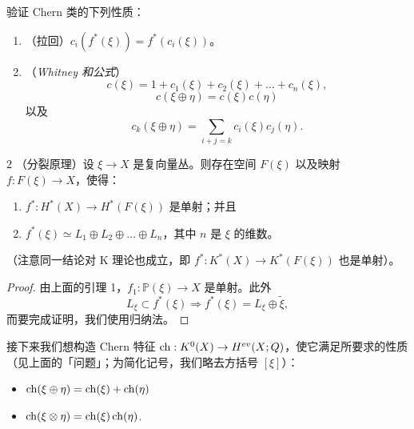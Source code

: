 验证 Chern 类的下列性质：
\begin{enumerate}[label=\arabic*.]
\item （拉回）$c_i(f^*(\xi)) = f^*(c_i(\xi))$。
\item （\emph{Whitney 和公式}）
\[ c(\xi) = 1+c_1(\xi)+c_2(\xi)+\ldots+c_n(\xi), \]
\[ c(\xi\oplus\eta) = c(\xi)c(\eta) \]
以及
\[ c_k(\xi\oplus\eta) = \sum_{i+j=k}c_i(\xi)c_j(\eta). \]
\end{enumerate}

\begin{lem}{2}
（分裂原理）设 $\xi\to X$ 是复向量丛。则存在空间 $F(\xi)$ 以及映射 $f : F(\xi)\to X$，使得：
\begin{enumerate}[label=\roman*.]
\item $f^* : H^*(X)\to H^*(F(\xi))$ 是单射；并且
\item $f^*(\xi)\simeq L_1\oplus L_2\oplus\ldots\oplus L_n$，其中 $n$ 是 $\xi$ 的维数。
\end{enumerate}
（注意同一结论对 K 理论也成立，即 $f^* : K^*(X)\to K^*(F(\xi))$ 也是单射）。
\end{lem}

\begin{proof}
由上面的引理 1，$f_1 : \mathbb{P}(\xi)\to X$ 是单射。此外
\[ L_\xi\subset f^*(\xi)\Rightarrow f^*(\xi) = L_\xi\oplus \tilde\xi, \]
而要完成证明，我们使用归纳法。
\end{proof}

接下来我们想构造 Chern 特征 $\operatorname{ch} : K^0(X)\to H^{ev}(X;Q)$，使它满足所要求的性质（见上面的「问题」；为简化记号，我们略去方括号 $[\xi]$）：
\begin{itemize}
\item $\operatorname{ch}(\xi\oplus\eta) = \operatorname{ch}(\xi)+\operatorname{ch}(\eta)$
\item $\operatorname{ch}(\xi\otimes\eta) = \operatorname{ch}(\xi)\operatorname{ch}(\eta)$.
\end{itemize}

